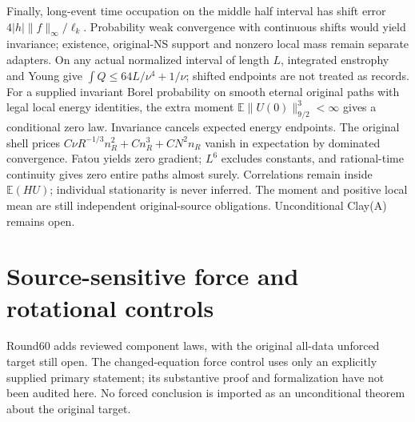 \documentclass[11pt]{article}
\begin{document}
Finally, long-event time occupation on the middle half interval has shift
error $4|h|\|f\|_\infty/\ell_k$. Probability weak convergence with continuous
shifts would yield invariance; existence, original-NS support and nonzero
local mass remain separate adapters. On any actual normalized interval of
length $L$, integrated enstrophy and Young give
$\int Q\le64L/\nu^4+1/\nu$; shifted endpoints are not treated as records.
For a supplied invariant Borel probability on smooth eternal original
paths with legal local energy identities, the extra moment
$\mathbb E\|U(0)\|_{9/2}^3<\infty$ gives a conditional zero law.
Invariance cancels expected energy endpoints. The original shell prices
$C\nu R^{-1/3}n_R^2+Cn_R^3+CN^2n_R$ vanish in expectation by dominated
convergence. Fatou yields zero gradient; $L^6$ excludes constants, and
rational-time continuity gives zero entire paths almost surely. Correlations
remain inside $\mathbb E(HU)$; individual stationarity is never inferred.
The moment and positive local mean are still independent original-source
obligations. Unconditional Clay(A) remains open.

\section{Source-sensitive force and rotational controls}
\label{sec:source-controls60}

Round60 adds reviewed component laws, with the original all-data unforced
target still open. The changed-equation force control uses only an
explicitly supplied primary statement; its substantive proof and
formalization have not been audited here. No forced conclusion is imported
as an unconditional theorem about the original target.
\end{document}
